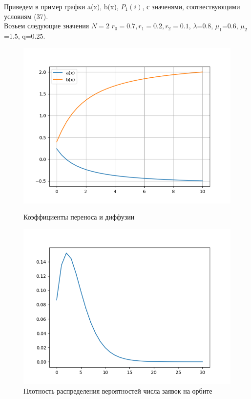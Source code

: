 Приведем в пример графки a(x), b(x), $P_{1}(i)$, с значенями, соотвествующими условиям (37).\\
Возьем следующие значения 	$N=2$ $r_{0}=0.7, r_{1}=0.2, r_{2}=0.1$, $\lambda$=0.8, $\mu_{1}$=0.6, $\mu_{2}$=1.5, q=0.25.

\begin{figure}[H]
	\centering
	\begin{minipage}[h]{0.49\linewidth}
		\includegraphics[width=0.8\linewidth]{ab2} 	
		\caption{Коэффициенты переноса и диффузии}
		\label{ris:experimoriginal}
	\end{minipage}
	\hfill
	\begin{minipage}[h]{0.49\linewidth}
		\includegraphics[width=0.8\linewidth]{P2} 
		\caption{Плотность распределения вероятностей числа заявок на орбите}
		\label{ris:experimcoded}
	\end{minipage}
\end{figure}


